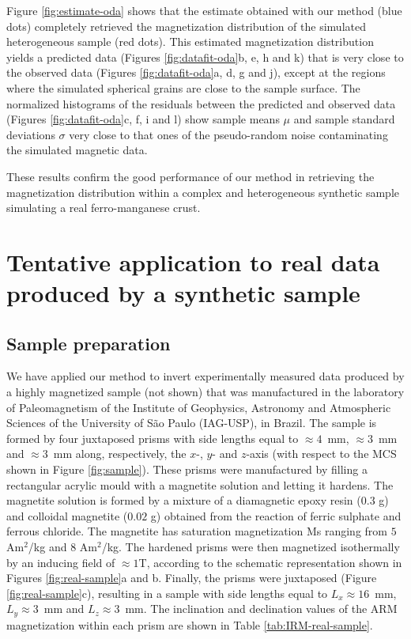 \documentclass[galley,gc]{agutex}
\begin{document}
\begin{article}
Figure \ref{fig:estimate-oda} shows that the estimate
obtained with our method (blue dots) completely retrieved the 
magnetization distribution of the simulated heterogeneous 
sample (red dots).
This estimated magnetization distribution yields a predicted data
(Figures \ref{fig:datafit-oda}b, e, h and k) that is very
close to the observed data (Figures \ref{fig:datafit-oda}a, 
d, g and j), except at the regions where the simulated spherical
grains are close to the sample surface.
The normalized histograms of the residuals between the predicted and
observed data (Figures \ref{fig:datafit-oda}c, f, i and l) show
sample means $\mu$ and sample standard deviations $\sigma$
very close to that ones of the pseudo-random noise 
contaminating the simulated magnetic data.

These results confirm the good performance of our method
in retrieving the magnetization distribution within a complex and
heterogeneous synthetic sample simulating a real ferro-manganese
crust.

\section{Tentative application to real data produced by a synthetic sample}
\label{sec:Tentative application to real data produced by a synthetic sample}

\subsection{Sample preparation}
\label{subsec:Sample preparation}

We have applied our method to invert experimentally measured
data produced by a highly magnetized sample (not shown) 
that was manufactured in the laboratory of Paleomagnetism of the
Institute of Geophysics, Astronomy and Atmospheric Sciences of the
University of S\~{a}o Paulo (IAG-USP), in Brazil.
The sample is formed by four juxtaposed prisms with side lengths
equal to $\approx 4$~mm, $\approx 3$~mm and $\approx 3$~mm along, 
respectively, the $x$-,
$y$- and $z$-axis (with respect to the MCS shown in Figure 
\ref{fig:sample}).
These prisms were manufactured by filling a rectangular 
acrylic mould with a magnetite solution and letting it hardens.
The magnetite solution is formed by a mixture of a diamagnetic 
epoxy resin ($0.3$ g) and colloidal magnetite ($0.02$ g) obtained 
from the reaction of ferric sulphate and ferrous chloride.
The magnetite has saturation magnetization Ms ranging from 
$5$ Am$^{2}$/kg and $8$ Am$^{2}$/kg.
The hardened prisms were then magnetized isothermally
by an inducing field of $\approx 1$T, according to the
schematic representation shown in Figures 
\ref{fig:real-sample}a and b.
Finally, the prisms were juxtaposed (Figure \ref{fig:real-sample}c),
resulting in a sample with side lengths equal to
$L_{x} \approx 16$~mm, $L_{y} \approx 3$~mm and 
$L_{z} \approx 3$~mm. The inclination and declination values 
of the ARM magnetization within each prism
are shown in Table \ref{tab:IRM-real-sample}.


\end{article}
\end{document}
